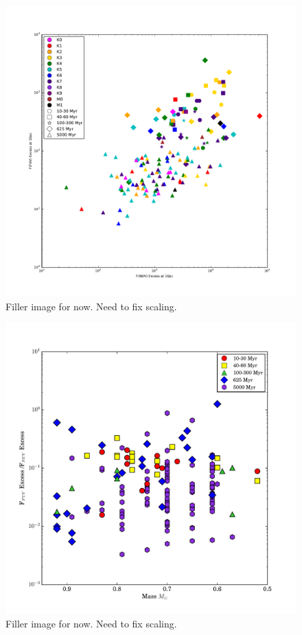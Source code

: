 \documentclass[twocolumn]{aastex62}
\begin{document}
\begin{figure}[h]
\includegraphics[width=\linewidth]{nuv_vs_fuv_NO_J.pdf}
\caption{Filler image for now. Need to fix scaling. \label{fig:nuv_vs_fuv}}
\end{figure}

\begin{figure}[h]
\includegraphics[width=\linewidth]{fuv_nuv_vs_mass_NO_J.pdf}
\caption{Filler image for now. Need to fix scaling. \label{fig:fuv_nuv_vs_mass}}
\end{figure}
\end{document}
